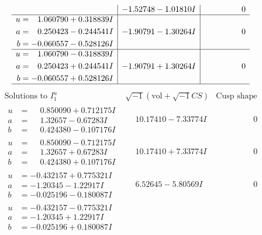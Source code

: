 \documentclass[1p]{elsarticle_modified}
\theoremstyle{definition}
\newcommand{\I}{\sqrt{-1}}
\begin{document}
$$\begin{array}{c|c|c}
 & -1.52748 - 1.01810 I & \phantom{-0.000000 } 0 \\ \hline\begin{aligned}
u &= \phantom{-}1.060790 + 0.318839 I \\
a &= \phantom{-}0.250423 - 0.244541 I \\
b &= -0.060557 - 0.528126 I\end{aligned}
 & -1.90791 - 1.30264 I & \phantom{-0.000000 } 0 \\ \hline\begin{aligned}
u &= \phantom{-}1.060790 - 0.318839 I \\
a &= \phantom{-}0.250423 + 0.244541 I \\
b &= -0.060557 + 0.528126 I\end{aligned}
 & -1.90791 + 1.30264 I & \phantom{-0.000000 } 0\\
 \hline 
 \end{array}$$\newpage$$\begin{array}{c|c|c}  
\text{Solutions to }I^u_{1}& \I (\text{vol} + \sqrt{-1}CS) & \text{Cusp shape}\\
 \hline 
\begin{aligned}
u &= \phantom{-}0.850090 + 0.712175 I \\
a &= \phantom{-}1.32657 - 0.67283 I \\
b &= \phantom{-}0.424380 - 0.107176 I\end{aligned}
 & \phantom{-}10.17410 - 7.33774 I & \phantom{-0.000000 } 0 \\ \hline\begin{aligned}
u &= \phantom{-}0.850090 - 0.712175 I \\
a &= \phantom{-}1.32657 + 0.67283 I \\
b &= \phantom{-}0.424380 + 0.107176 I\end{aligned}
 & \phantom{-}10.17410 + 7.33774 I & \phantom{-0.000000 } 0 \\ \hline\begin{aligned}
u &= -0.432157 + 0.775321 I \\
a &= -1.20345 - 1.22917 I \\
b &= -0.025196 - 0.180087 I\end{aligned}
 & \phantom{-}6.52645 - 5.80569 I & \phantom{-0.000000 } 0 \\ \hline\begin{aligned}
u &= -0.432157 - 0.775321 I \\
a &= -1.20345 + 1.22917 I \\
b &= -0.025196 + 0.180087 I\end{aligned}

\end{array}$$
\end{document}
